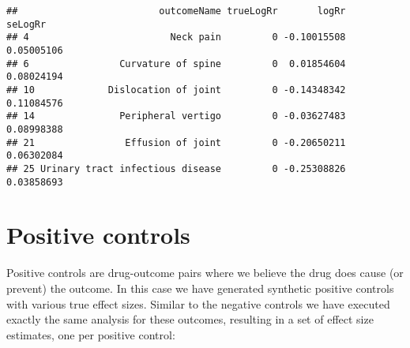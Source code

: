 \documentclass[]{article}
\newenvironment{Shaded}{\begin{snugshade}}{\end{snugshade}}
\newcommand{\DecValTok}[1]{\textcolor[rgb]{0.00,0.00,0.81}{#1}}
\newcommand{\KeywordTok}[1]{\textcolor[rgb]{0.13,0.29,0.53}{\textbf{#1}}}
\newcommand{\NormalTok}[1]{#1}
\newcommand{\OperatorTok}[1]{\textcolor[rgb]{0.81,0.36,0.00}{\textbf{#1}}}
\newcommand{\StringTok}[1]{\textcolor[rgb]{0.31,0.60,0.02}{#1}}
\begin{document}
\begin{Shaded}
\end{Shaded}

\begin{verbatim}
##                         outcomeName trueLogRr       logRr    seLogRr
## 4                         Neck pain         0 -0.10015508 0.05005106
## 6                Curvature of spine         0  0.01854604 0.08024194
## 10             Dislocation of joint         0 -0.14348342 0.11084576
## 14               Peripheral vertigo         0 -0.03627483 0.08998388
## 21                Effusion of joint         0 -0.20650211 0.06302084
## 25 Urinary tract infectious disease         0 -0.25308826 0.03858693
\end{verbatim}

\hypertarget{positive-controls}{%
\section{Positive controls}\label{positive-controls}}

Positive controls are drug-outcome pairs where we believe the drug does
cause (or prevent) the outcome. In this case we have generated synthetic
positive controls with various true effect sizes. Similar to the
negative controls we have executed exactly the same analysis for these
outcomes, resulting in a set of effect size estimates, one per positive
control:

\begin{Shaded}
\end{Shaded}
\end{document}
